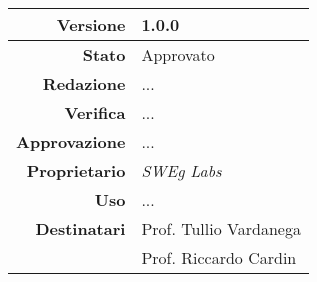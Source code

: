\begin{center}
\begin{tabular}{r|l}
    \textbf{Versione} & 1.0.0 \\
    \hline
    \textbf{Stato} & Approvato \\
    \hline
    \textbf{Redazione} & ... \\
    \hline
    \textbf{Verifica} & ... \\
    \hline
    \textbf{Approvazione} & ... \\
    \hline
    \textbf{Proprietario} & \emph{SWEg Labs} \\
    \hline
    \textbf{Uso} & ... \\
    \hline
    \textbf{Destinatari} & Prof. Tullio Vardanega \\
                            & Prof. Riccardo Cardin \\
\end{tabular}
\end{center}
    